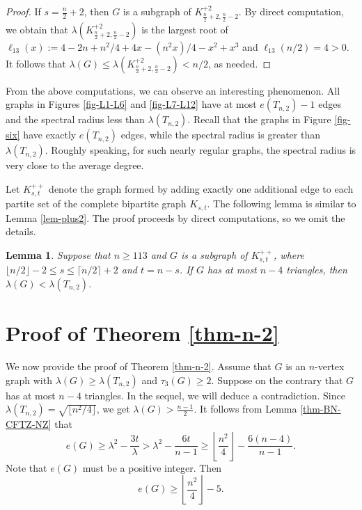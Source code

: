 \documentclass[11pt]{article}
\newtheorem{lemma}[theorem]{Lemma}
\begin{document}
\begin{proof}
 If $s=\frac{n}{2} +2$, then $G$ is a subgraph of 
 $K_{\frac{n}{2} +2, \frac{n}{2} -2}^{+2}$. 
 By direct computation, we obtain that 
 $\lambda (K_{\frac{n}{2} +2, \frac{n}{2} -2}^{+2})$ 
 is the largest root of $\ell_{13}(x):=4 - 2 n + n^2/4 + 4 x - (n^2 x)/4 - x^2 + x^3$ and $\ell_{13}(n/2) = 4>0$. 
It follows that $\lambda (G)\le \lambda (K_{\frac{n}{2} +2, \frac{n}{2} -2}^{+2}) < n/2$, as needed. 
\end{proof}



From the above computations, we can observe an interesting phenomenon.  
All graphs in Figures \ref{fig-L1-L6} and \ref{fig-L7-L12} 
have at most $e(T_{n,2}) -1$ edges and the spectral radius less than $\lambda (T_{n,2})$. 
Recall that the graphs in Figure \ref{fig-six} have exactly $e(T_{n,2})$ edges, while the spectral radius is greater than $\lambda (T_{n,2})$. 
Roughly speaking, for such nearly regular graphs, 
the spectral radius is very close to the average degree. 

 
Let $K_{s,t}^{++}$ denote the graph formed by adding exactly one additional edge to each partite set of the complete bipartite graph $K_{s,t}$.   
The following lemma is similar to Lemma \ref{lem-plus2}. 
The proof proceeds by direct computations, so we omit the details. 

\begin{lemma} \label{lem-plus1}
Suppose that $n\ge 113$ and $G$ is a subgraph of $K_{s,t}^{++}$, where 
$\lfloor {n}/{2} \rfloor -2 \le s 
\le \lceil {n}/{2} \rceil +2$ and $t=n-s$. 
If $G$ has at most $n-4$ triangles, then 
$\lambda (G)< \lambda (T_{n,2})$. 
\end{lemma}









\section{Proof of Theorem \ref{thm-n-2}}
\label{sec4}

We now provide the proof of Theorem \ref{thm-n-2}.  
Assume that $G$ is an $n$-vertex graph with $\lambda (G) \ge \lambda (T_{n,2})$ and $\tau_3(G) \ge 2$. 
Suppose on the contrary  that 
$G$  has at most $n-4$ triangles. 
In the sequel, we will deduce a contradiction.  
Since $\lambda (T_{n,2})= \sqrt{\lfloor n^2/4\rfloor} $, we get 
$\lambda (G) > \frac{n-1}{2}$. 
It follows  from Lemma \ref{thm-BN-CFTZ-NZ} that 
\[   e(G)\ge \lambda^2- \frac{3t}{\lambda} 
> \lambda^2 - \frac{6t}{n-1} \ge   
\left\lfloor \frac{n^2}{4} \right\rfloor - \frac{6(n-4)}{n-1} . \]  
Note that $e(G)$ must be a positive integer. Then 
\[  e(G)\ge \left \lfloor \frac{n^2}{4} \right\rfloor  -5. \]
\end{document}
